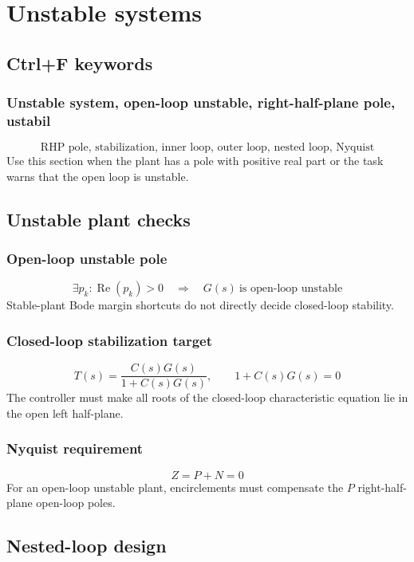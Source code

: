 \section{Unstable systems}

\subsection{Ctrl+F keywords}

\subsubsection{Unstable system, open-loop unstable, right-half-plane pole, ustabil}
\[
\text{RHP pole, stabilization, inner loop, outer loop, nested loop, Nyquist}
\]
Use this section when the plant has a pole with positive real part or the task warns that the open loop is unstable.

\subsection{Unstable plant checks}

\subsubsection{Open-loop unstable pole}
\[
\exists p_k:\operatorname{Re}(p_k)>0
\quad\Longrightarrow\quad
G(s)\ \text{is open-loop unstable}
\]
Stable-plant Bode margin shortcuts do not directly decide closed-loop stability.

\subsubsection{Closed-loop stabilization target}
\[
T(s)=\frac{C(s)G(s)}{1+C(s)G(s)},\qquad
1+C(s)G(s)=0
\]
The controller must make all roots of the closed-loop characteristic equation lie in the open left half-plane.

\subsubsection{Nyquist requirement}
\[
Z=P+N=0
\]
For an open-loop unstable plant, encirclements must compensate the \(P\) right-half-plane open-loop poles. %

\subsection{Nested-loop design}

